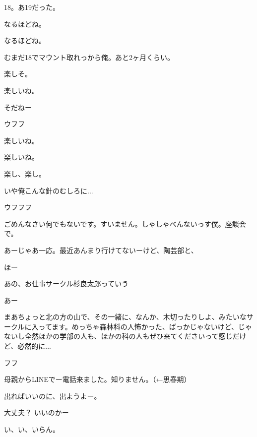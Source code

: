 \begin{multicols}{3}
{        18。あ19だった。

        なるほどね。

        なるほどね。

        むまだ18でマウント取れっから俺。あと2ヶ月くらい。

        楽しそ。

        楽しいね。

        そだねー

        ウフフ

        楽しいね。

        楽しいね。

        楽し、楽し。

        いや俺こんな針のむしろに...

        ウフフフ

        ごめんなさい何でもないです。すいません。しゃしゃべんないっす僕。座談会で。

    


    

        あーじゃあ一応。最近あんまり行けてないーけど、陶芸部と、

        ほー

        あの、お仕事サークル杉良太郎っていう

        あー

        まあちょっと北の方の山で、その一緒に、なんか、木切ったりしよ、みたいなサークルに入ってます。めっちゃ森林科の人怖かった、ばっかじゃないけど、じゃないし全然ほかの学部の人も、ほかの科の人もぜひ来てくださいって感じだけど、必然的に...

    


    

        フフ

        母親からLINEでー電話来ました。知りません。（←思春期）

        出ればいいのに、出ようよー。

        大丈夫？ いいのかー

        い、い、いらん。

}
\end{multicols}
